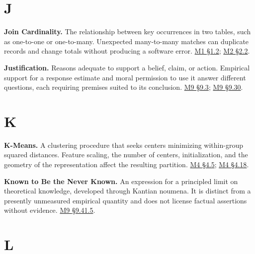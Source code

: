 \par{}
\hypertarget{module-j}{%
\section*{J}\label{module-j}}

\noindent\textbf{Join Cardinality.} The relationship between key occurrences in
two tables, such as one-to-one or one-to-many. Unexpected many-to-many
matches can duplicate records and change totals without producing a
software error.
\href{Marketing_Analytics_Lecture_Notes.pdf\#M01-the-unit-of-observation-determines-the-calculation}{M1
§1.2};
\href{Marketing_Analytics_Lecture_Notes.pdf\#M02-build-a-customer-table-without-losing-customers}{M2
§2.2}.

\noindent\textbf{Justification.} Reasons adequate to support a belief, claim, or
action. Empirical support for a response estimate and moral permission
to use it answer different questions, each requiring premises suited to
its conclusion.
\hyperref[M09-a-critical-examination-of-marketing-claims]{M9
§9.3};
\hyperref[M09-what-a-company-ought-to-do]{M9
§9.30}.

\par{}
\hypertarget{module-k}{%
\section*{K}\label{module-k}}

\noindent\textbf{K-Means.} A clustering procedure that seeks centers minimizing
within-group squared distances. Feature scaling, the number of centers,
initialization, and the geometry of the representation affect the
resulting partition.
\href{Marketing_Analytics_Lecture_Notes.pdf\#M04-segmentation-begins-with-a-definition-of-similarity}{M4
§4.5};
\href{Marketing_Analytics_Lecture_Notes.pdf\#M04-clustering-cost-and-the-meaning-of-a-segment}{M4
§4.18}.

\noindent\textbf{Known to Be the Never Known.} An expression for a principled
limit on theoretical knowledge, developed through Kantian noumena. It is
distinct from a presently unmeasured empirical quantity and does not
license factual assertions without evidence.
\hyperref[M09-the-known-to-be-the-never-known]{M9
§9.41.5}.

\par{}
\hypertarget{module-l}{%
\section*{L}\label{module-l}}

